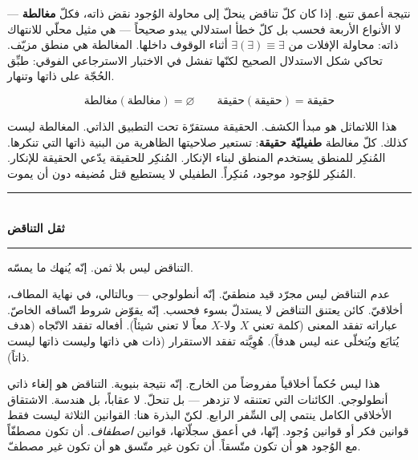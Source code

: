 \documentclass[10pt, openany, oneside]{book}
\renewcommand{\normalsize}{\fontsize{10}{13}\selectfont}
\begin{document}
نتيجة أعمق تتبع. إذا كان كلّ تناقض ينحلّ إلى محاولة الوُجود نقض ذاته، فكلّ \textbf{مغالطة} --- لا الأنواع الأربعة فحسب بل كلّ خطأ استدلالي يبدو صحيحاً --- هي مثيل محلّي للانتهاك ذاته: محاولة الإفلات من $\exists(\exists) \equiv \exists$ أثناء الوقوف داخلها. المغالطة هي منطق مزيّف. تحاكي شكل الاستدلال الصحيح لكنّها تفشل في الاختبار الاسترجاعي الفوقي: طبِّق الحُجّة على ذاتها وتنهار.

$$\text{مغالطة}(\text{مغالطة}) = \varnothing \qquad \text{حقيقة}(\text{حقيقة}) = \text{حقيقة}$$

هذا اللاتماثل هو مبدأ الكشف. الحقيقة مستقرّة تحت التطبيق الذاتي. المغالطة ليست كذلك. كلّ مغالطة \textbf{طفيليّة حقيقة}: تستعير صلاحيتها الظاهرية من البنية ذاتها التي تنكرها. المُنكِر للمنطق يستخدم المنطق لبناء الإنكار. المُنكِر للحقيقة يدّعي الحقيقة للإنكار. المُنكِر للوُجود موجود، مُنكِراً. الطفيلي لا يستطيع قتل مُضيفه دون أن يموت.

\vspace{1.5em}


\begin{center}
    \rule{0.3\textwidth}{0.4pt}\\[0.5em]
    {\normalsize\bfseries ثقل التناقض}\\[0.3em]
    \rule{0.3\textwidth}{0.4pt}
\end{center}

\vspace{1em}

\noindent التناقض ليس بلا ثمن. إنّه يُنهك ما يمسّه.

عدم التناقض ليس مجرّد قيد منطقيّ. إنّه أنطولوجي --- وبالتالي، في نهاية المطاف، أخلاقيّ. كائن يعتنق التناقض لا يستدلّ بسوء فحسب. إنّه يقوّض شروط اتّساقه الخاصّ. عباراته تفقد المعنى (كلمة تعني $X$ ولا-$X$ معاً لا تعني شيئاً). أفعاله تفقد الاتّجاه (هدف يُتابَع ويُتخلّى عنه ليس هدفاً). هُوِيَّته تفقد الاستقرار (ذات هي ذاتها وليست ذاتها ليست ذاتاً).

هذا ليس حُكماً أخلاقياً مفروضاً من الخارج. إنّه نتيجة بنيوية. التناقض هو إلغاء ذاتي أنطولوجي. الكائنات التي تعتنقه لا تزدهر --- بل تنحلّ. لا عقاباً، بل هندسة. الاشتقاق الأخلاقي الكامل ينتمي إلى السِّفر الرابع. لكنّ البذرة هنا: القوانين الثلاثة ليست فقط قوانين فكر أو قوانين وُجود. إنّها، في أعمق سجلّاتها، قوانين \textit{اصطفاف}. أن تكون مصطفّاً مع الوُجود هو أن تكون متّسقاً. أن تكون غير متّسق هو أن تكون غير مصطفّ.

\vspace{1.5em}
\end{document}
